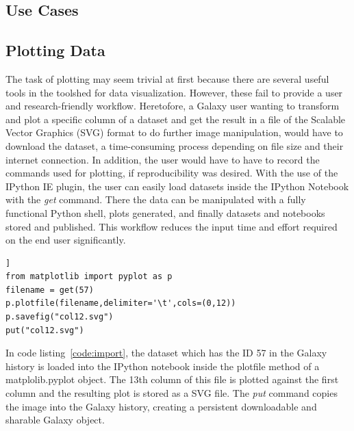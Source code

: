 \documentclass{bioinfo}
\begin{document}
\begin{methods}
\section{Use Cases}
\subsection{Plotting Data}
The task of plotting may seem trivial at first because there are several useful tools in the toolshed for data visualization.
However, these fail to provide a user and research-friendly workflow.
Heretofore, a Galaxy user wanting to transform and plot a specific column of a dataset and
get the result in a file of the Scalable Vector Graphics (SVG) format to do further image manipulation,
would have to download the dataset, a time-consuming process depending on file size and their internet
connection. In addition, the user would have to have to record the commands used for plotting, if reproducibility was desired.
With the use of the IPython IE plugin, the user can easily load datasets inside the IPython Notebook with the \textit{get} command. There the data can be manipulated 
with a fully functional Python shell, plots generated, and finally datasets and notebooks stored and published.
This workflow reduces the input time and effort required on the end user significantly.

\begin{lstlisting}[frame=single,caption={Use Case Example},label=code:import]]
from matplotlib import pyplot as p
filename = get(57)
p.plotfile(filename,delimiter='\t',cols=(0,12))
p.savefig("col12.svg")
put("col12.svg")
\end{lstlisting}
In code listing~\ref{code:import}, the dataset which has the ID 57 in the Galaxy history is loaded into the IPython notebook inside the
plotfile method of a matplolib.pyplot object. The 13th column of this file is plotted against the first column and the
resulting plot is stored as a SVG file. The \textit{put} command copies the image into the Galaxy history, creating a persistent
downloadable and sharable Galaxy object.



\end{methods}
\end{document}
